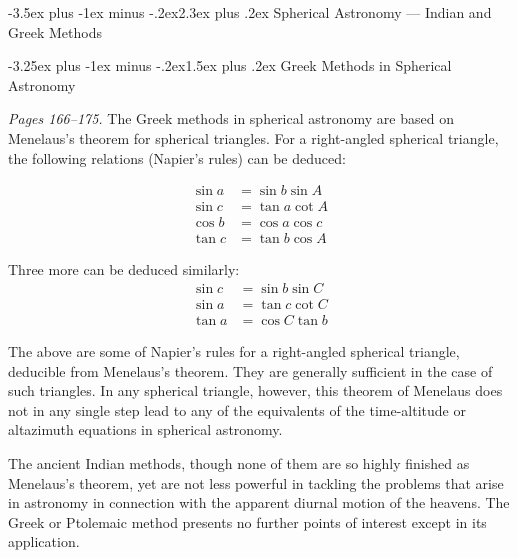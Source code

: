 \documentclass[11pt,a4paper]{article}
\makeatletter
\renewcommand{\section}{\@startsection {section}{1}{\z@}%
  {-3.5ex plus -1ex minus -.2ex}{2.3ex plus .2ex}%
  {\normalfont\Large\bfseries\color{sectioncolor}}}
\renewcommand{\subsection}{\@startsection{subsection}{2}{\z@}%
  {-3.25ex plus -1ex minus -.2ex}{1.5ex plus .2ex}%
  {\normalfont\large\bfseries\color{sectioncolor}}}
\newcommand{\cnote}[1]{\textcolor{notecolor}{\textit{#1}}}
\makeatother
\begin{document}
\section{Spherical Astronomy --- Indian and Greek Methods}
\label{sec:spherical}

\subsection{Greek Methods in Spherical Astronomy}

\cnote{Pages 166--175.} The Greek methods in spherical astronomy are based on Menelaus's theorem for spherical triangles. For a right-angled spherical triangle, the following relations (Napier's rules) can be deduced:

\begin{align}
\sin a &= \sin b \sin A \\
\sin c &= \tan a \cot A \\
\cos b &= \cos a \cos c \\
\tan c &= \tan b \cos A
\end{align}

Three more can be deduced similarly:
\begin{align}
\sin c &= \sin b \sin C \\
\sin a &= \tan c \cot C \\
\tan a &= \cos C \tan b
\end{align}

The above are some of Napier's rules for a right-angled spherical triangle, deducible from Menelaus's theorem. They are generally sufficient in the case of such triangles. In any spherical triangle, however, this theorem of Menelaus does not in any single step lead to any of the equivalents of the time-altitude or altazimuth equations in spherical astronomy.

The ancient Indian methods, though none of them are so highly finished as Menelaus's theorem, yet are not less powerful in tackling the problems that arise in astronomy in connection with the apparent diurnal motion of the heavens. The Greek or Ptolemaic method presents no further points of interest except in its application.

\end{document}
